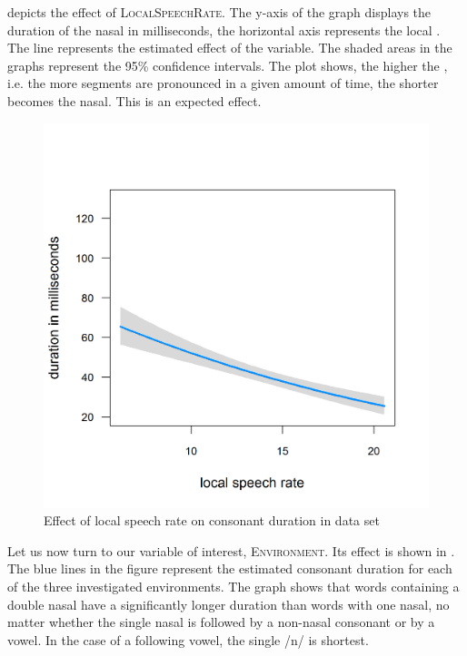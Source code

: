  depicts the effect of \textsc{LocalSpeechRate}.  The y-axis of the graph displays the duration of the nasal in milliseconds, the horizontal axis represents the local . The line represents the estimated effect of the variable. The shaded areas in the graphs represent the 95\% confidence intervals. The  plot shows, the higher the , i.e. the more segments are pronounced in a given amount of time, the shorter becomes the nasal. This is an expected effect.





\begin{figure}
	

	\includegraphics [scale=0.4]{images/Corpus/unModelSpeechRate.png}
	\caption{ Effect of local speech rate on consonant duration in data set}
	\label{fig:SpeechRate un}

\end{figure}





Let us now turn to our variable of interest, \textsc{Environment}. Its effect is shown in . The blue lines in the figure represent the estimated consonant duration for each of the three investigated environments. The graph shows that words containing a double nasal have a significantly longer duration than words with one nasal, no matter whether the single nasal is followed by a non-nasal consonant or by a vowel. In the case of a following vowel, the single /n/ is shortest. 




